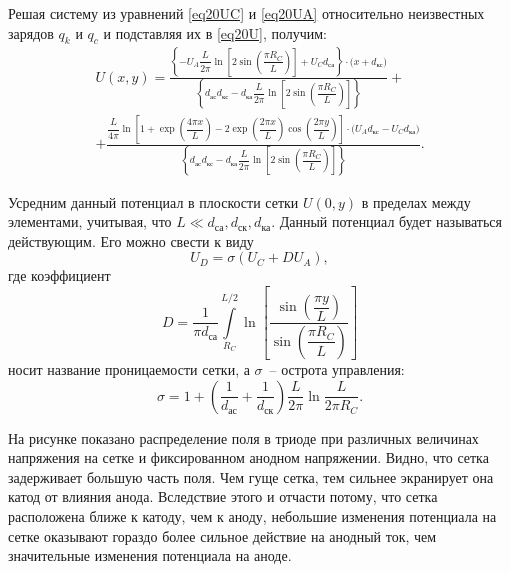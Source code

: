 Решая систему из уравнений \eqref{eq20UC} и \eqref{eq20UA} относительно неизвестных
зарядов \( q_k \) и \( q_c \) и подставляя их в \eqref{eq20U}, получим:
\begin{gather*}
  U(x, y) = \frac{\left\{ -U_A \dfrac{L}{2\pi} \ln\left[ 2\sin\left(
    \dfrac{\pi R_C}{L} \right) \right] + U_C d_\text{са} \right\} \cdot
    \Big( x + d_\text{кс} \Big)}{\left\{ d_\text{ас} d_\text{кс} - d_\text{ка}
    \dfrac{L}{2\pi} \ln\left[ 2\sin\left( \dfrac{\pi R_C}{L}
    \right) \right] \right\}} + \\
  + \frac{\dfrac{L}{4\pi} \ln\left[ 1 + \exp\left( \dfrac{4\pi x}{L} \right) -
    2\exp\left( \dfrac{2\pi x}{L} \right) \cos\left( \dfrac{2\pi y}{L} \right)
    \right] \cdot \Big(U_A d_\text{кс} - U_C d_\text{ка} \Big)}{\left\{
    d_\text{ас} d_\text{кс} - d_\text{ка} \dfrac{L}{2\pi} \ln\left[
    2\sin\left( \dfrac{\pi R_C}{L} \right) \right] \right\}}.
\end{gather*}

Усредним данный потенциал в плоскости сетки \( U(0, y) \) в пределах между
элементами, учитывая, что \( L \ll d_\text{са}, d_\text{ск}, d_\text{ка} \).
Данный потенциал будет называться действующим. Его можно свести к виду
\begin{equation}
  U_D = \sigma (U_C + D U_A),
  \label{eq20UD}
\end{equation}
где коэффициент
\[
  D = \frac{1}{\pi d_\text{са}} \int\limits_{R_C}^{L / 2} \ln\left[
    \frac{\sin\left( \dfrac{\pi y}{L} \right)}{\sin\left( \dfrac{\pi R_C}{L}
    \right)} \right]
\]
носит название проницаемости сетки, а \( \sigma \)~-- острота управления:
\[
  \sigma = 1 + \left( \frac{1}{d_\text{ас}} + \frac{1}{d_\text{ск}} \right)
    \frac{L}{2\pi} \ln\frac{L}{2\pi R_C}.
\]

На рисунке  показано распределение поля в триоде при различных
величинах напряжения на сетке и фиксированном анодном напряжении. Видно, что
сетка задерживает большую часть поля. Чем гуще сетка, тем сильнее экранирует
она катод от влияния анода. Вследствие этого и отчасти потому, что сетка
расположена ближе к катоду, чем к аноду, небольшие изменения потенциала на
сетке оказывают гораздо более сильное действие на анодный ток, чем значительные
изменения потенциала на аноде.
